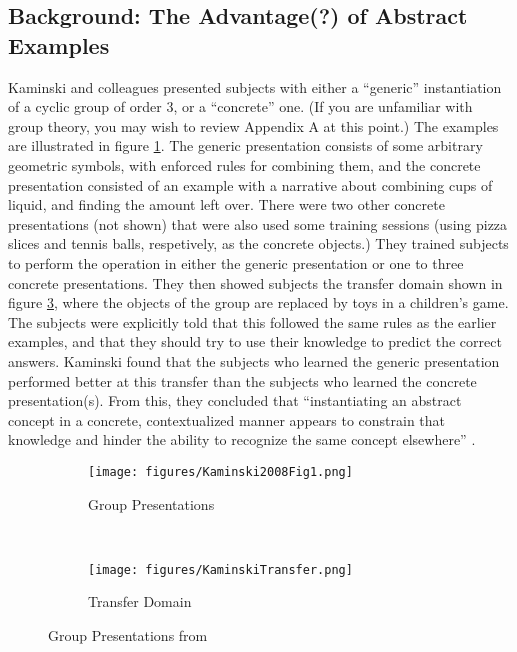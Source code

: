 \documentclass[11pt]{article}
\begin{document}
\subsection{Background: The Advantage(?) of Abstract Examples}
Kaminski and colleagues \cite{Kaminski2008} presented subjects with either a ``generic'' instantiation of a cyclic group of order 3, or a ``concrete'' one. (If you are unfamiliar with group theory, you may wish to review Appendix A at this point.) The examples are illustrated in figure \ref{kaminskitraining}. The generic presentation consists of some arbitrary geometric symbols, with enforced rules for combining them, and the concrete presentation consisted of an example with a narrative about combining cups of liquid, and finding the amount left over. There were two other concrete presentations (not shown) that were also used some training sessions (using pizza slices and tennis balls, respetively, as the concrete objects.) They trained subjects to perform the operation in either the generic presentation or one to three concrete presentations. They then showed subjects the transfer domain shown in figure \ref{kaminskitransfer}, where the objects of the group are replaced by toys in a children's game. The subjects were explicitly told that this followed the same rules as the earlier examples, and that they should try to use their knowledge to predict the correct answers. Kaminski found that the subjects who learned the generic presentation performed better at this transfer than the subjects who learned the concrete presentation(s). From this, they concluded that ``instantiating an abstract concept in a concrete, contextualized manner appears to constrain that knowledge and hinder the ability to recognize the same concept elsewhere'' \cite{Kaminski2008}. \\[11pt]
\begin{figure} \centering \begin{subfigure}{0.5\textwidth} \caption{Group Presentations} \label{kaminskitraining} \texttt{[image: figures/Kaminski2008Fig1.png]} \end{subfigure} \\ \begin{subfigure}{0.5\textwidth} \caption{Transfer Domain} \label{kaminskitransfer} \texttt{[image: figures/KaminskiTransfer.png]} \end{subfigure} \caption{Group Presentations from \cite{Kaminski2008}} \end{figure}
\end{document}
